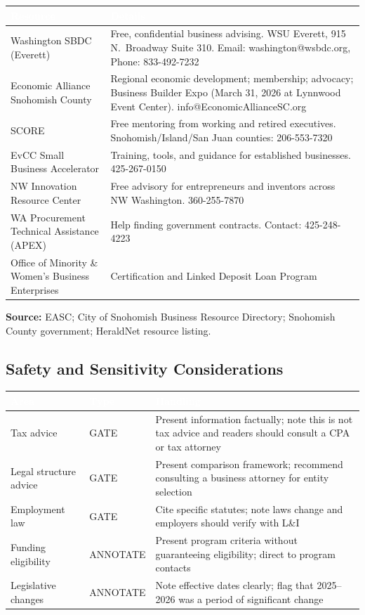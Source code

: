 \documentclass[11pt,letterpaper]{article}
\newcommand{\tableheader}[1]{\textbf{\sffamily\textcolor{white}{#1}}}
\begin{document}
\begin{center}
\begin{tabularx}{\textwidth}{L{4.5cm}X}
\toprule
{}
\tableheader{Resource} & \tableheader{Details} \\
\midrule
Washington SBDC (Everett) & Free, confidential business advising. WSU Everett, 915 N.\ Broadway Suite 310. Email: washington@wsbdc.org, Phone: 833-492-7232 \\
Economic Alliance Snohomish County & Regional economic development; membership; advocacy; Business Builder Expo (March 31, 2026 at Lynnwood Event Center). info@EconomicAllianceSC.org \\
SCORE & Free mentoring from working and retired executives. Snohomish/Island/San Juan counties: 206-553-7320 \\
EvCC Small Business Accelerator & Training, tools, and guidance for established businesses. 425-267-0150 \\
NW Innovation Resource Center & Free advisory for entrepreneurs and inventors across NW Washington. 360-255-7870 \\
WA Procurement Technical Assistance (APEX) & Help finding government contracts. Contact: 425-248-4223 \\
Office of Minority \& Women's Business Enterprises & Certification and Linked Deposit Loan Program \\
\bottomrule
\end{tabularx}
\end{center}

\textbf{Source:} EASC; City of Snohomish Business Resource Directory; Snohomish County government; HeraldNet resource listing.

\subsection{Safety and Sensitivity Considerations}

\begin{center}
\begin{tabularx}{\textwidth}{L{3cm}L{2cm}X}
\toprule
{}
\tableheader{Area} & \tableheader{Type} & \tableheader{Handling} \\
\midrule
Tax advice & GATE & Present information factually; note this is not tax advice and readers should consult a CPA or tax attorney \\
Legal structure advice & GATE & Present comparison framework; recommend consulting a business attorney for entity selection \\
Employment law & GATE & Cite specific statutes; note laws change and employers should verify with L\&I \\
Funding eligibility & ANNOTATE & Present program criteria without guaranteeing eligibility; direct to program contacts \\
Legislative changes & ANNOTATE & Note effective dates clearly; flag that 2025--2026 was a period of significant change \\
\bottomrule
\end{tabularx}
\end{center}
\end{document}
